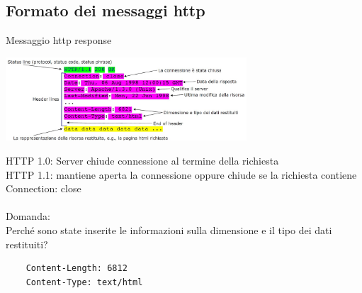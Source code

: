 \subsection{Formato dei messaggi http}
Messaggio http response
\begin{center}
    \includegraphics[width=0.675\textwidth]{img/MOC_messaggi3.jpg}
\end{center}
HTTP 1.0: Server chiude connessione al termine della richiesta
\\HTTP 1.1: mantiene aperta la connessione oppure chiude se la richiesta contiene Connection: close
\\
\\Domanda:
\\Perché sono state inserite le informazioni sulla dimensione e il tipo dei dati restituiti?
\begin{verbatim}
    Content-Length: 6812
    Content-Type: text/html
\end{verbatim}








